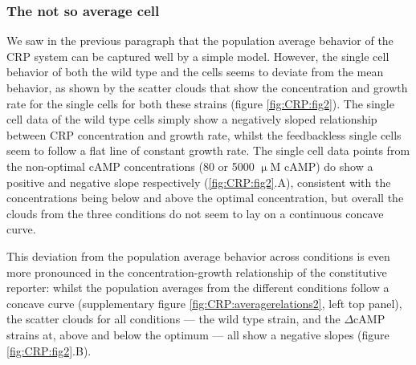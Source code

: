 \subsubsection{The not so average cell}

We saw in the previous paragraph that the population average behavior of the CRP system
can be captured well by a simple model.
%
However, the single cell behavior of both the wild type and the \dcamp cells seems to deviate from the mean behavior, 
%
as shown by the scatter clouds that show the concentration and growth rate for the single cells for both these strains (figure \ref{fig:CRP:fig2}).
%
%
The single cell data of the wild type cells 
simply show a negatively sloped relationship between CRP concentration and growth rate, whilst the feedbackless single cells 
seem to follow a flat line of constant growth rate. 
%
The single cell data points from the non-optimal cAMP concentrations (80 or 5000 $\upmu$M cAMP) do show a positive and negative slope respectively (\ref{fig:CRP:fig2}.A), 
consistent with the concentrations being below and above the optimal concentration,
but overall the clouds from the three conditions do not seem to lay on a continuous concave curve. 
%



This deviation from the population average behavior across conditions is even more pronounced in the concentration-growth relationship of the constitutive reporter:
whilst the population averages from the different conditions follow a concave curve (supplementary figure \ref{fig:CRP:averagerelations2}, left top panel), 
%
the scatter clouds for all conditions --- the wild type strain, and the $\Delta$cAMP strains at, above and below the optimum --- all show a negative slopes (figure \ref{fig:CRP:fig2}.B).


